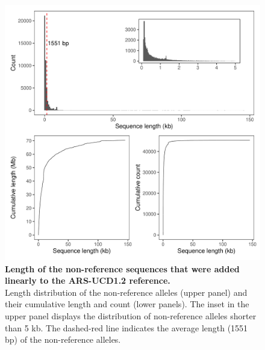 \documentclass[../main.tex]{subfiles}
\begin{document}
\begin{flushleft}
\begin{figure}[!htb]
    \centering
    \includegraphics[width=\textwidth]{paper3/supplement/sp46.pdf}
    \caption[Distribution of the nonreference sequences]{\textbf{Length of the non-reference sequences that were added linearly to the ARS-UCD1.2 reference.} \\
    \small{Length distribution of the non-reference alleles (upper panel) and their cumulative length and count (lower panels). The inset in the upper panel displays the distribution of non-reference alleles shorter than 5 kb. The dashed-red line indicates the average length (1551 bp) of the non-reference alleles.}}
    \label{sup_fig:s46}
\end{figure}

\newpage


\end{flushleft}
\end{document}
